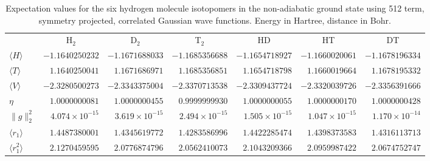 \begin{table}[!pth]
\caption{Expectation values for the six hydrogen molecule isotopomers 
         in the non-adiabatic ground state
         using 512 term, symmetry projected, 
         correlated {G}aussian wave functions.
         Energy in Hartree, distance in Bohr.  
\label{evals}}

\begin{tabular}{lrrrrrr}
     &\multicolumn{1}{c}{H$_2$} &\multicolumn{1}{c}{D$_2$}
     &\multicolumn{1}{c}{T$_2$} &\multicolumn{1}{c}{HD} 
     &\multicolumn{1}{c}{HT}    &\multicolumn{1}{c}{DT}   \\

$\langle H \rangle$ & $-1.1640250232 $ 
                    & $-1.1671688033 $
                    & $-1.1685356688 $ 
                    & $-1.1654718927 $
                    & $-1.1660020061 $
                    & $-1.1678196334 $ \\

$\langle T \rangle$ & $1.1640250041 $ 
                    & $1.1671686971 $
                    & $1.1685356851 $
                    & $1.1654718798 $ 
                    & $1.1660019664 $ 
                    & $1.1678195332 $ \\

$\langle V \rangle$ & $-2.3280500273 $
                    & $-2.3343375004 $ 
                    & $-2.3370713538 $
                    & $-2.3309437724 $
                    & $-2.3320039726 $
                    & $-2.3356391666 $ \\

$\eta$              & $1.0000000081 $
                    & $1.0000000455 $
                    & $0.9999999930 $
                    & $1.0000000055 $
                    & $1.0000000170 $
                    & $1.0000000428 $ \\

$\|g\|_{2}^{2}$     & $4.074 \times 10^{-15} $
                    & $3.619 \times 10^{-15} $
                    & $2.494 \times 10^{-15} $
                    & $1.505 \times 10^{-15} $
                    & $1.047 \times 10^{-15} $
                    & $1.170 \times 10^{-14} $ \\

$\langle r_1 \rangle$ & $1.4487380001 $
                      & $1.4345619772 $
                      & $1.4283586996 $
                      & $1.4422285474 $
                      & $1.4398373583 $
                      & $1.4316113713 $ \\

$\langle r_{1}^{2} \rangle$ & $2.1270459595 $
                            & $2.0776874796 $ 
                            & $2.0562410073 $
                            & $2.1043209366 $
                            & $2.0959987422 $
                            & $2.0674752747 $ \\

\end{tabular}
\end{table}


%


